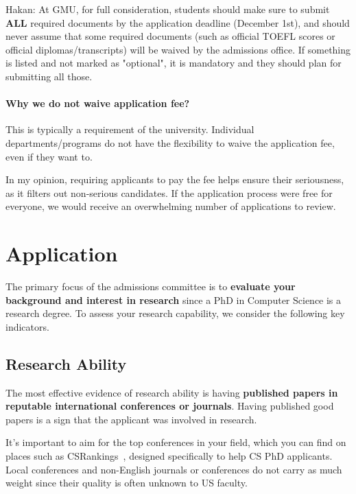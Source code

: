 \documentclass[10pt]{article}
\begin{document}
\begin{tcolorbox}[left=1pt,right=1pt,top=1pt,bottom=1pt]
    Hakan: At GMU, for full consideration, students should make sure to submit \textbf{ALL} required documents by the application deadline (December 1st), and should never assume that some required documents (such as official TOEFL scores or official diplomas/transcripts) will be waived by the admissions office. If something is listed and not marked as "optional", it is mandatory and they should plan for submitting all those.  
\end{tcolorbox}
\paragraph{Why we do not waive application fee?}  This is typically a requirement of the university. Individual departments/programs do not have the flexibility to waive the application fee, even if they want to. 

In my opinion, requiring applicants to pay the fee helps ensure their seriousness, as it filters out non-serious candidates. If the application process were free for everyone, we would receive an overwhelming number of applications to review.


\section{Application}\label{sec:application}

The primary focus of the admissions committee is to \textbf{evaluate your background and interest in research} since a PhD in Computer Science
is a research degree. To assess your research capability, we consider
the following key indicators.

\subsection{Research Ability}

The most effective evidence of research ability is having \textbf{published papers in reputable international conferences or journals}.
Having published good papers is a sign that the applicant was involved in research.

It's important to aim for the top conferences in your field, which you can
find on places such as CSRankings~\cite{csrankings}, designed specifically to help CS PhD
applicants. Local conferences and non-English journals or conferences do
not carry as much weight since their quality is often unknown to US
faculty.
\end{document}
